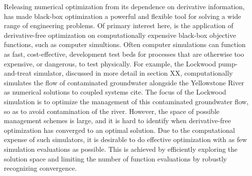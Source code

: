 \documentclass[12pt]{article}
\begin{document}
%
Releasing numerical optimization from its dependence on derivative information, has made black-box optimization a powerful and flexible tool for solving a wide range of engineering problems.
%
Of primary interest here, is the application of derivative-free optimization on computationally expensive black-box objective functions, such as computer simultions.
%
Often computer simulations can function as fast, cost-effective, development test beds for processes that are otherwise too expensive, or dangerous, to test physically. 
For example, the Lockwood pump-and-treat simulator, discussed in more detail in section {\color{red}XX}, computationally simulates the flow of contaminated groundwater alongside the Yellowstone River as numerical solutions to coupled systems {\color{red}cite}.
%
The focus of the Lockwood simulation is to optimize the management of this contaminated groundwater flow, so as to avoid contamination of the river.
However, the space of possible management schemes is large, and it is hard to identify when derivative-free optimization has converged to an optimal solution.
Due to the computational expense of such simulators, it is desirable to do effective optimization with as few simulation evaluations as possible.
This is achieved by efficiently exploring the solution space and limiting the number of function evaluations by robustly recognizing convergence.


%
%
\end{document}
